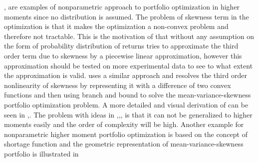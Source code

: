 \documentclass[12pt,a4paper]{article}
\numberwithin{equation}{section}
\begin{document}
\citep{Glawischnig2013},\cite{Jondeau2006} are examples of nonparametric approach to portfolio optimization in higher moments since no distribution is assumed. The problem of skewness term in the optimization is that it makes the optimization a non-convex problem and therefore not tractable. This is the motivation of \citep{Konno1993} that without any assumption on the form of probability distribution of returns tries to approximate the third order term due to skewness by a piecewise linear approximation, however this approximation should be tested on more experimental data to see to what extent the approximation is valid. \citep{Konno1998} uses a similar approach and resolves the third order nonlinearity of skewness by representing it with a difference of two convex functions and then using branch and bound to solve the mean-variance-skewness portfolio optimization problem. A more detailed and visual derivation of \citep{Konno1998} can be seen in \citep{Konno1995},\citep{Konno2005}. The problem with ideas in \citep{Konno1993},\citep{Konno1998},\citep{Konno1995},\citep{Konno2005} is that it can not be generalized to higher moments easily and the order of complexity will be high. Another example for nonparametric higher moment portfolio optimization is based on the concept of shortage function and the geometric representation of mean-variance-skewness portfolio is illustrated in \citep{Kerstens2011}  
\end{document}
